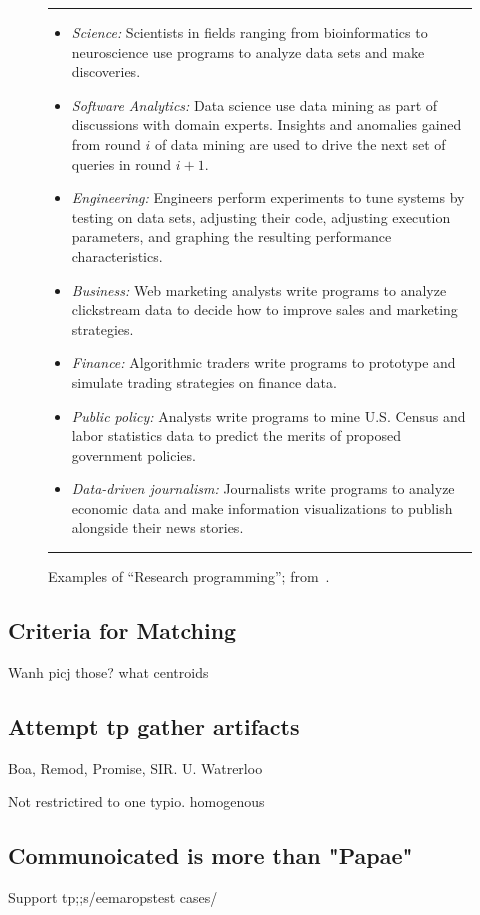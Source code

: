 \documentclass[journal]{IEEEtran}
\newcommand{\bi}{\begin{itemize}}
\newcommand{\ei}{\end{itemize}}
\begin{document}
\begin{figure}[!b]
\small
\hrule

\bi
\item 
{\em Science:} Scientists in fields ranging from bioinformatics to neuroscience use programs to analyze data sets and make  discoveries.
\item
{\em Software Analytics:} Data science use data mining
as part of discussions with domain experts. Insights and anomalies gained from round $i$ of data mining are used to
drive the next set of queries in round $i+1$.
\item
{\em Engineering:} Engineers perform experiments to tune systems by testing on data sets, adjusting their code, adjusting execution parameters, and graphing the resulting performance characteristics.
\item
{\em Business:} Web marketing analysts write programs to analyze clickstream data to decide how to improve sales and marketing strategies.
\item
{\em Finance:} Algorithmic traders write programs to prototype and simulate  trading strategies on finance data.
\item
{\em Public policy:} Analysts write programs to mine U.S. Census and labor statistics data to predict the merits of proposed government policies.
\item
{\em Data-driven journalism: }Journalists write programs to analyze economic data and make information visualizations to publish alongside their news stories.
\ei
\hrule
\caption{Examples of ``Research programming'';
from~\cite{goa12}.}\label{fig:eg}
\end{figure}
\subsection{Criteria for Matching}
Wanh picj those? what centroids
\subsection{Attempt tp gather artifacts}
Boa, Remod, Promise, SIR. U. Watrerloo

Not restrictired to one typio. homogenous

\subsection{Communoicated is more than "Papae"}

Support tp;;s/eemaropstest cases/
\end{document}
